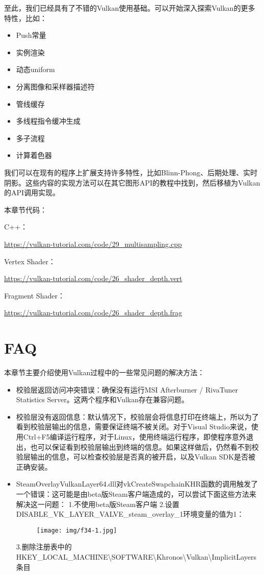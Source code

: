 \documentclass{ctexart}
\begin{document}
至此，我们已经具有了不错的Vulkan使用基础。可以开始深入探索Vulkan的更多特性，比如：

\begin{itemize}
	\item Push常量
	\item 实例渲染
	\item 动态uniform
	\item 分离图像和采样器描述符
	\item 管线缓存
	\item 多线程指令缓冲生成
	\item 多子流程
	\item 计算着色器
\end{itemize}

我们可以在现有的程序上扩展支持许多特性，比如Blinn-Phong、后期处理、实时阴影。这些内容的实现方法可以在其它图形API的教程中找到，然后移植为Vulkan的API调用实现。

本章节代码：

C++：

\url{https://vulkan-tutorial.com/code/29_multisampling.cpp}

Vertex Shader：

\url{https://vulkan-tutorial.com/code/26_shader_depth.vert}

Fragment Shader：

\url{https://vulkan-tutorial.com/code/26_shader_depth.frag}

\newpage
\section{FAQ}

本章节主要介绍使用Vulkan过程中的一些常见问题的解决方法：

\begin{itemize}
	\item 校验层返回访问冲突错误：确保没有运行MSI Afterburner / RivaTuner Statistics Server。这两个程序和Vulkan存在兼容问题。
	\item 校验层没有返回信息：默认情况下，校验层会将信息打印在终端上，所以为了看到校验层输出的信息，需要保证终端不被关闭。对于Visual Studio来说，使用Ctrl+F5编译运行程序，对于Linux，使用终端运行程序，即使程序意外退出，也可以保证看到校验层输出到终端的信息。如果这样做后，仍然看不到校验层输出的信息，可以检查校验层是否真的被开启，以及Vulkan SDK是否被正确安装。
	\item SteamOverlayVulkanLayer64.dll对vkCreateSwapchainKHR函数的调用触发了一个错误：这可能是由beta版Steam客户端造成的，可以尝试下面这些方法来解决这一问题：
	\subitem 1.不使用beta版Steam客户端
	\subitem 2.设置DISABLE\_VK\_LAYER\_VALVE\_steam\_overlay\_1环境变量的值为1：
	\begin{figure}[H]
		\centering
		\texttt{[image: img/f34-1.jpg]}
	\end{figure}
	\subitem 3.删除注册表中的HKEY\_LOCAL\_MACHINE\textbackslash SOFTWARE\textbackslash Khronos\textbackslash Vulkan\textbackslash ImplicitLayers条目
\end{itemize}
\end{document}
